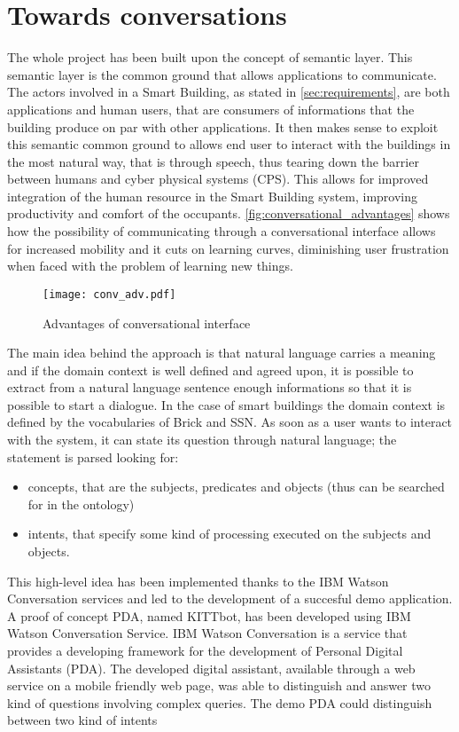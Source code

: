 \section{Towards conversations}\label{sec:conversational_interface}
The whole project has been built upon the concept of semantic layer. This semantic layer is the common ground that allows applications to communicate. The actors involved in a Smart Building, as stated in \autoref{sec:requirements}, are both applications and human users, that are consumers of informations that the building produce on par with other applications. It then makes sense to exploit this semantic common ground to allows end user to interact with the buildings in the most natural way, that is through speech, thus tearing down the barrier between humans and cyber physical systems (CPS). This allows for improved integration of the human resource in the Smart Building system, improving productivity and comfort of the occupants. \autoref{fig:conversational_advantages} shows how the possibility of communicating through a conversational interface allows for increased mobility and it cuts on learning curves, diminishing user frustration when faced with the problem of learning new things.
\begin{figure}
  \centering
  \texttt{[image: conv\_adv.pdf]}
  \caption{Advantages of conversational interface}
  \label{fig:conversational_advantages}
\end{figure}
The main idea behind the approach is that natural language carries a meaning and if the domain context is well defined and agreed upon, it is possible to extract from a natural language sentence enough informations so that it is possible to start a dialogue. In the case of smart buildings the domain context is defined by the vocabularies of Brick and SSN. As soon as a user wants to interact with the system, it can state its question through natural language; the statement is parsed looking for:
\begin{itemize}
  \item concepts, that are the subjects, predicates and objects (thus can be searched for in the ontology)
  \item intents, that specify some kind of processing executed on the subjects and objects.
\end{itemize}
This high-level idea has been implemented thanks to the IBM Watson Conversation services and led to the development of a succesful demo application. A proof of concept PDA, named KITTbot, has been developed using IBM Watson Conversation Service. IBM Watson Conversation is a service that provides a developing framework for the development of Personal Digital Assistants (PDA). The developed digital assistant, available through a web service on a mobile friendly web page, was able to distinguish and answer two kind of questions involving complex queries. The demo PDA could distinguish between two kind of intents
